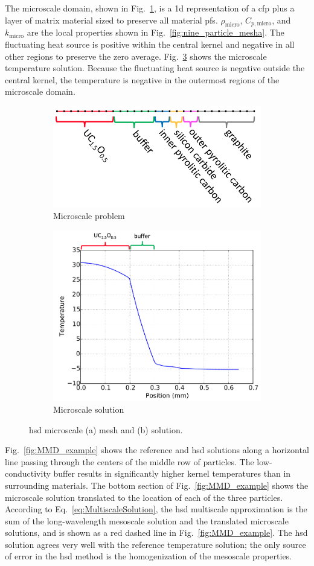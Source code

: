 The microscale domain, shown in Fig.\ \ref{fig:micro_a}, is a \gls{1d} representation of a \gls{cfp} plus a layer of matrix material sized to preserve all material \glspl{pf}. \(\rho_\text{micro}\), \(C_{p,\text{micro}}\), and \(k_\text{micro}\) are the local properties shown in Fig.\ \ref{fig:nine_particle_mesha}. The fluctuating heat source is positive within the central kernel and negative in all other regions to preserve the zero average. Fig.\ \ref{fig:micro_b} shows the microscale temperature solution. Because the fluctuating heat source is negative outside the central kernel, the temperature is negative in the outermost regions of the microscale domain.

\begin{figure}[!h]
\centering
\begin{subfigure}[b]{0.49\linewidth}
\centering
\includegraphics[width=6.cm]{figs/microscale_domain_colored.png}
\vspace{2em}
\caption{Microscale problem}
\label{fig:micro_a}
\end{subfigure}
\begin{subfigure}[b]{0.49\linewidth}
\centering
\includegraphics[height=6.cm]{figs/microscale_solution.png}
\caption{Microscale solution}
\label{fig:micro_b}
\end{subfigure}
\caption{\gls{hsd} microscale (a) mesh and (b) solution.}
\end{figure}

Fig.\ \ref{fig:MMD_example} shows the reference and \gls{hsd} solutions along a horizontal line passing through the centers of the middle row of particles. The low-conductivity buffer results in significantly higher kernel temperatures than in surrounding materials. The bottom section of Fig.\ \ref{fig:MMD_example} shows the microscale solution translated to the location of each of the three particles. According to Eq.\ \eqref{eq:MultiscaleSolution}, the \gls{hsd} multiscale approximation is the sum of the long-wavelength mesoscale solution and the translated microscale solutions, and is shown as a red dashed line in Fig.\ \ref{fig:MMD_example}. The \gls{hsd} solution agrees very well with the reference temperature solution; the only source of error in the \gls{hsd} method is the homogenization of the mesoscale properties.

